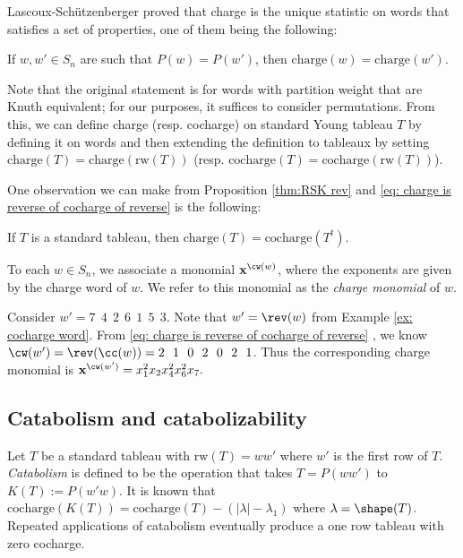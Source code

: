 Lascoux-Sch\"{u}tzenberger \cite{LS1}  proved that charge is the unique statistic on words that satisfies a set of properties, one of them being the following:

\begin{thm}
    If $w,w' \in S_n$ are such that $P(w) = P(w')$, then $\text{charge}(w) = \text{charge}(w')$.
\end{thm} 
Note that the original statement is  for words with partition weight that are Knuth equivalent; for our purposes, it suffices to consider permutations.
From this, we can define charge (resp. cocharge) on standard Young tableau $T$ by defining it on words and then extending the definition to tableaux by setting $\text{charge}(T) = \text{charge}(\text{rw}(T))$ (resp. $\text{cocharge}(T) = \text{cocharge}(\text{rw}(T))$).

One observation we can make from Proposition \ref{thm:RSK rev} and \eqref{eq: charge is reverse of cocharge of reverse} is the following:

\begin{prop}\label{thm: charge cocharge trabspose}
    If $T$ is a standard tableau, then
    $\text{charge}(T) = \text{cocharge}(T^t)$.
\end{prop}


To each $w \in S_n$, we associate a monomial $\mathbf{x}^{\cw(w)}$, where the exponents are given by the charge word of $w$. We refer to this monomial as the \textit{charge monomial }of $w$. 
\begin{ex}
Consider $w' = 7 \ \ 4 \ \ 2 \ \ 6\ \ 1 \ \ 5 \ \ 3 .$  Note that $w' = \rev(w)$ from Example \ref{ex: cocharge word}.
From \eqref{eq: charge is reverse of cocharge of reverse} , we know 
$\cw(w') = \rev(\cc(w)) = 2 \ \ 1 \ \ 0 \ \ 2 \ \ 0 \ \ 2 \ \ 1 $. Thus the corresponding charge monomial is $\mathbf{x}^{\cw(w')} = x_1^2 x_2 x_4^2x_6^2x_7.$
\end{ex}


\subsection{Catabolism and catabolizability}\label{section:cat}
Let $T$ be a standard tableau with $\text{rw}(T) = w w'$ where $w'$ is the first row of $T$. \textit{Catabolism} is defined to be the operation that takes $T = P(w w')$ to $K(T) := P(w' w)$. It is known that $\text{cocharge}(K(T)) = \text{cocharge}(T)- (|\lambda| - \lambda_1)$ where $\lambda = \shape(T)$. Repeated applications of catabolism eventually produce a one row tableau with zero cocharge.

